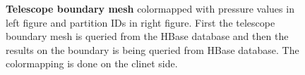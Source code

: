 \documentclass[]{report}
\begin{document}
\begin{figure}[!ht]
	\hfill
	\hfill
	\caption[Telescope Boundary Mesh]{\textbf{Telescope boundary mesh} colormapped with pressure values in left figure and partition IDs in right figure. First the telescope boundary mesh is queried from the HBase database and then the results on the boundary is being queried from HBase database. The colormapping is done on the clinet side.}
	\label{fig:telescope}
\end{figure}
\end{document}
